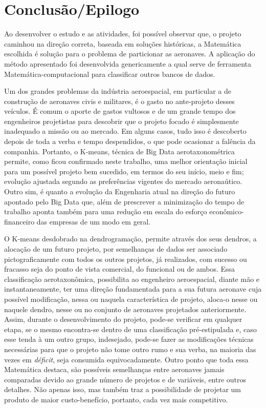 \documentclass[12pt]{article} %
\begin{document}
	
	\newpage
	\section{Conclusão/Epilogo}
	
	Ao desenvolver o estudo e as atividades, foi possível observar que, o projeto caminhou na direção correta, baseada em soluções históricas, a Matemática escolhida é solução para o problema de particionar as aeronaves. A aplicação do método apresentado foi desenvolvida genericamente a qual serve de ferramenta Matemática-computacional para classificar outros bancos de dados.
	
	Um dos grandes problemas da indústria aeroespacial, em particular a de construção de aeronaves civis e militares, é o gasto no ante-projeto desses veículos. É comum o aporte de gastos vultosos e de um grande tempo dos engenheiros projetistas para descobrir que o projeto focado é simplesmente inadequado a missão ou ao mercado. Em alguns casos, tudo isso é descoberto depois de toda a verba e tempo despendidos, o que pode ocasionar a falência da companhia. Portanto, o K-means, técnica de Big Data aerotaxonométrica permite, como ficou confirmado neste trabalho, uma melhor orientação inicial para um possível projeto bem sucedido, em termos do seu início, meio e fim; evolução ajustada segundo as preferências vigentes do mercado aeronaútico. Outro sim, é quanto a evolução da Engenharia atual na direção do futuro apontado pelo Big Data que, além de prescrever a minimização do tempo de trabalho aponta também para uma redução em escala do esforço econômico-financeiro das empresas de um modo em geral.
	
	O K-means desdobrado na dendrogramação, permite através dos seus dendros, a alocação de um futuro projeto, por semelhanças de dados ser associado pictograficamente com todos os outros projetos, já realizados, com sucesso ou fracasso seja do ponto de vista comercial, do funcional ou de ambos. Essa classificação aerotaxonômica, possibilita ao engenheiro aeroespacial, diante mão e instantaneamente, ter uma direção fundamentada para a sua futura aeronave cuja possível modificação, nessa ou naquela característica de projeto, aloca-o nesse ou naquele dendro, nesse ou no conjunto de aeronaves projetados anteriormente. Assim, durante o desenvolvimento do projeto, pode-se verificar em qualquer etapa, se o mesmo encontra-se dentro de uma classificação pré-estipulada e, caso esse tenda à um outro grupo, indesejado, pode-se fazer as modificações técnicas necessárias para que o projeto não tome outro rumo e sua verba, na maioria das vezes em \textit{déficit}, seja consumida equivocadamente. Outro ponto que toda essa Matemática destaca, são possíveis semelhanças entre aeronaves jamais comparadas devido ao grande número de projetos e de variáveis, entre outros detalhes. Não apenas isso, mas também traz a possibilidade de projetar um produto de maior custo-benefício, portanto, cada vez mais competitivo.
	
\end{document}
